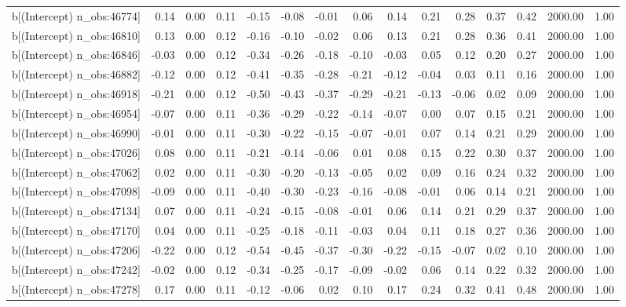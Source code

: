 \begin{table}[ht]
\begin{tabular}{rrrrrrrrrrrrrrr}
  b[(Intercept) n\_obs:46774] & 0.14 & 0.00 & 0.11 & -0.15 & -0.08 & -0.01 & 0.06 & 0.14 & 0.21 & 0.28 & 0.37 & 0.42 & 2000.00 & 1.00 \\ 
  b[(Intercept) n\_obs:46810] & 0.13 & 0.00 & 0.12 & -0.16 & -0.10 & -0.02 & 0.06 & 0.13 & 0.21 & 0.28 & 0.36 & 0.41 & 2000.00 & 1.00 \\ 
  b[(Intercept) n\_obs:46846] & -0.03 & 0.00 & 0.12 & -0.34 & -0.26 & -0.18 & -0.10 & -0.03 & 0.05 & 0.12 & 0.20 & 0.27 & 2000.00 & 1.00 \\ 
  b[(Intercept) n\_obs:46882] & -0.12 & 0.00 & 0.12 & -0.41 & -0.35 & -0.28 & -0.21 & -0.12 & -0.04 & 0.03 & 0.11 & 0.16 & 2000.00 & 1.00 \\ 
  b[(Intercept) n\_obs:46918] & -0.21 & 0.00 & 0.12 & -0.50 & -0.43 & -0.37 & -0.29 & -0.21 & -0.13 & -0.06 & 0.02 & 0.09 & 2000.00 & 1.00 \\ 
  b[(Intercept) n\_obs:46954] & -0.07 & 0.00 & 0.11 & -0.36 & -0.29 & -0.22 & -0.14 & -0.07 & 0.00 & 0.07 & 0.15 & 0.21 & 2000.00 & 1.00 \\ 
  b[(Intercept) n\_obs:46990] & -0.01 & 0.00 & 0.11 & -0.30 & -0.22 & -0.15 & -0.07 & -0.01 & 0.07 & 0.14 & 0.21 & 0.29 & 2000.00 & 1.00 \\ 
  b[(Intercept) n\_obs:47026] & 0.08 & 0.00 & 0.11 & -0.21 & -0.14 & -0.06 & 0.01 & 0.08 & 0.15 & 0.22 & 0.30 & 0.37 & 2000.00 & 1.00 \\ 
  b[(Intercept) n\_obs:47062] & 0.02 & 0.00 & 0.11 & -0.30 & -0.20 & -0.13 & -0.05 & 0.02 & 0.09 & 0.16 & 0.24 & 0.32 & 2000.00 & 1.00 \\ 
  b[(Intercept) n\_obs:47098] & -0.09 & 0.00 & 0.11 & -0.40 & -0.30 & -0.23 & -0.16 & -0.08 & -0.01 & 0.06 & 0.14 & 0.21 & 2000.00 & 1.00 \\ 
  b[(Intercept) n\_obs:47134] & 0.07 & 0.00 & 0.11 & -0.24 & -0.15 & -0.08 & -0.01 & 0.06 & 0.14 & 0.21 & 0.29 & 0.37 & 2000.00 & 1.00 \\ 
  b[(Intercept) n\_obs:47170] & 0.04 & 0.00 & 0.11 & -0.25 & -0.18 & -0.11 & -0.03 & 0.04 & 0.11 & 0.18 & 0.27 & 0.36 & 2000.00 & 1.00 \\ 
  b[(Intercept) n\_obs:47206] & -0.22 & 0.00 & 0.12 & -0.54 & -0.45 & -0.37 & -0.30 & -0.22 & -0.15 & -0.07 & 0.02 & 0.10 & 2000.00 & 1.00 \\ 
  b[(Intercept) n\_obs:47242] & -0.02 & 0.00 & 0.12 & -0.34 & -0.25 & -0.17 & -0.09 & -0.02 & 0.06 & 0.14 & 0.22 & 0.32 & 2000.00 & 1.00 \\ 
  b[(Intercept) n\_obs:47278] & 0.17 & 0.00 & 0.11 & -0.12 & -0.06 & 0.02 & 0.10 & 0.17 & 0.24 & 0.32 & 0.41 & 0.48 & 2000.00 & 1.00 \\ 

\end{tabular}
\end{table}
